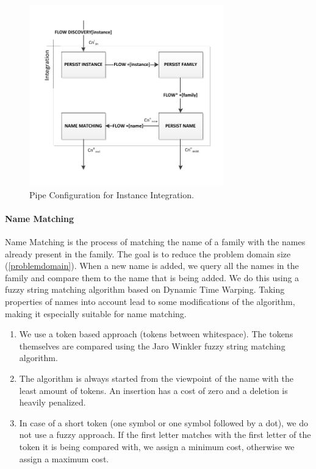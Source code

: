 \begin{figure}[htb]
	\centering
		\includegraphics[width=0.75\textwidth]{fig/integrationpipe}
	\caption{Pipe Configuration for Instance Integration.}
	\label{fig:integrationpipe}
\end{figure}

\paragraph{Name Matching} Name Matching is the process of matching the name of a family with the names already present in the family. The goal is to reduce the problem domain size (\autoref{problemdomain}). When a new name is added, we query all the names in the family and compare them to the name that is being added. We do this using a fuzzy string matching algorithm based on Dynamic Time Warping. Taking properties of names into account lead to some modifications of the algorithm, making it especially suitable for name matching.

\begin{enumerate}
\item We use a token based approach (tokens between whitespace). The tokens themselves are compared using the Jaro Winkler fuzzy string matching algorithm.
\item The algorithm is always started from the viewpoint of the name with the least amount of tokens. An insertion has a cost of zero and a deletion is heavily penalized.
\item In case of a short token (one symbol or one symbol followed by a dot), we do not use a fuzzy approach. If the first letter matches with the first letter of the token it is being compared with, we assign a minimum cost, otherwise we assign a maximum cost.
\end{enumerate}

